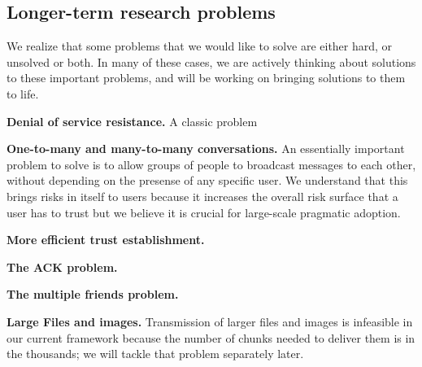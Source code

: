 \subsection{Longer-term research problems} 
We realize that some problems that we would like to solve are either hard, or unsolved or both. In many of these cases, we are actively thinking about solutions to these important problems, and will be working on bringing solutions to them to life.

\textbf{Denial of service resistance.} A classic problem

\textbf{One-to-many and many-to-many conversations.} An essentially important problem to solve is to allow groups of people to broadcast messages to each other, without depending on the presense of any specific user. We understand that this brings risks in itself to users because it increases the overall risk surface that a user has to trust but we believe it is crucial for large-scale pragmatic adoption.

\textbf{More efficient trust establishment.}

\textbf{The ACK problem.}

\textbf{The multiple friends problem.}

\textbf{Large Files and images.} Transmission of larger files and images is infeasible in our current framework because the number of chunks needed to deliver them is in the thousands; we will tackle that problem separately later.
